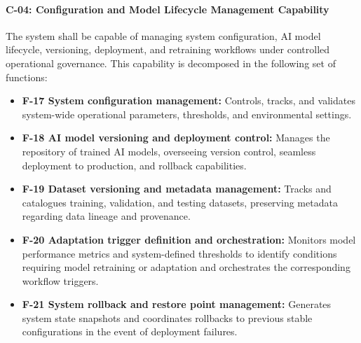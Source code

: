 \paragraph{C-04: Configuration and Model Lifecycle Management Capability}
The system shall be capable of managing system configuration, AI model lifecycle, versioning, deployment, and retraining workflows under controlled operational governance. This capability is decomposed in the following set of functions:
\begin{itemize}
    \item \textbf{F-17 System configuration management:} Controls, tracks, and validates system-wide operational parameters, thresholds, and environmental settings.
    \item \textbf{F-18 AI model versioning and deployment control:} Manages the repository of trained AI models, overseeing version control, seamless deployment to production, and rollback capabilities.
    \item \textbf{F-19 Dataset versioning and metadata management:} Tracks and catalogues training, validation, and testing datasets, preserving metadata regarding data lineage and provenance.
    \item \textbf{F-20 Adaptation trigger definition and orchestration:} Monitors model performance metrics and system-defined thresholds to identify conditions requiring model retraining or adaptation and orchestrates the corresponding workflow triggers.
    \item \textbf{F-21 System rollback and restore point management:} Generates system state snapshots and coordinates rollbacks to previous stable configurations in the event of deployment failures.
\end{itemize}

